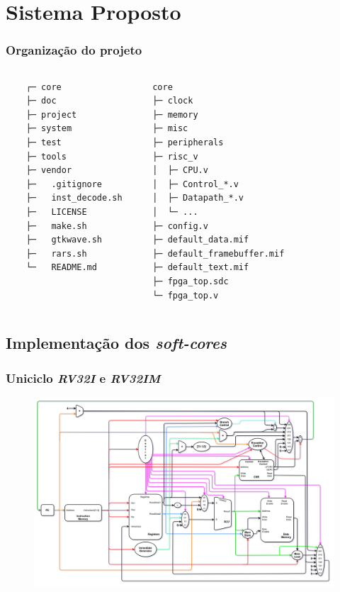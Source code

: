\documentclass[aspectratio=169]{beamer}
\begin{document}
\section{Sistema Proposto}
    \begin{frame}[fragile]
        \frametitle{Organização do projeto}
        \footnotesize{
        \begin{columns}
            \begin{verbatim}
    ┌─ core
    ├─ doc
    ├─ project
    ├─ system
    ├─ test
    ├─ tools
    ├─ vendor
    ├─   .gitignore
    ├─   inst_decode.sh
    ├─   LICENSE
    ├─   make.sh
    ├─   gtkwave.sh
    ├─   rars.sh
    └─   README.md
        \end{verbatim}
        \vfill
        \begin{verbatim}
   core
   ├─ clock
   ├─ memory
   ├─ misc
   ├─ peripherals
   ├─ risc_v
   │  ├─ CPU.v
   │  ├─ Control_*.v
   │  ├─ Datapath_*.v
   │  └─ ...
   ├─ config.v
   ├─ default_data.mif
   ├─ default_framebuffer.mif
   ├─ default_text.mif
   ├─ fpga_top.sdc
   └─ fpga_top.v
        \end{verbatim}
        \vfill
        \end{columns}}
    \end{frame}

    \subsection{Implementação dos \textit{soft-cores}}
    \begin{frame}
        \frametitle{Uniciclo \textit{RV32I} e \textit{RV32IM}}
        \vfill
        \begin{figure}[H]
        \centering
            \includegraphics[width=.9\textwidth,height=.85\textheight,keepaspectratio]{../images/uarch_diagrams/singlecycle-RV32I-RV32IM.png}
        \end{figure}
        \vfill
    \end{frame}
\end{document}

